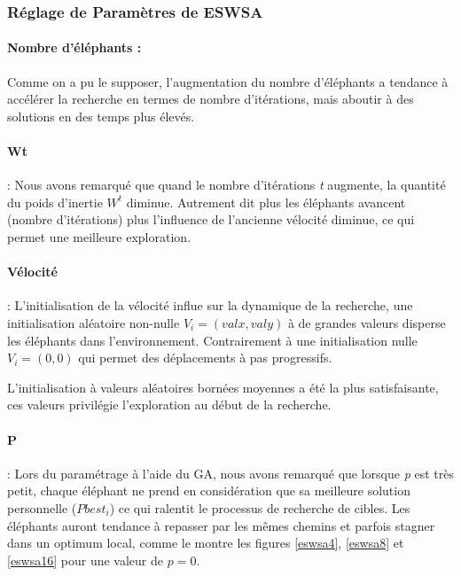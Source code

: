 	\vspace{-0.5cm}
	
	\subsubsection{Réglage de Paramètres de ESWSA}
	
	\paragraph{Nombre d’éléphants :} Comme on a pu le supposer, l'augmentation du nombre d'éléphants a tendance à accélérer la recherche en termes de nombre d'itérations, mais aboutir à des solutions en des temps plus élevés.
	
	
	\paragraph{Wt}:
	Nous avons remarqué que quand le nombre d'itérations \textit{t} augmente, la quantité du poids d'inertie \textit{$W^t$} diminue. Autrement dit plus les éléphants avancent (nombre d'itérations) plus l'influence de l'ancienne vélocité diminue, ce qui permet une meilleure exploration.
	
	\paragraph{Vélocité}:
	L'initialisation de la vélocité influe sur la dynamique de la recherche, une initialisation aléatoire non-nulle $V_{i}=(valx,valy)$ à de grandes valeurs  disperse les éléphants dans l'environnement. Contrairement à une initialisation nulle $V_{i}=(0,0)$ qui permet des déplacements à pas progressifs.    
	
	L'initialisation à valeurs aléatoires bornées moyennes a été la plus satisfaisante, ces valeurs privilégie l'exploration au début de la recherche.
	
	\paragraph{P}:
	Lors du paramétrage à l'aide du GA, nous avons remarqué que lorsque \textit{p} est très petit, chaque éléphant ne prend en considération que sa meilleure solution personnelle ($Pbest_i$) ce qui ralentit le processus de recherche de cibles. Les éléphants auront tendance à repasser par les mêmes chemins et parfois stagner dans un optimum local, comme le montre les figures %
	\ref{eswsa4}, \ref{eswsa8} et \ref{eswsa16} pour une valeur de $p=0$.
	

